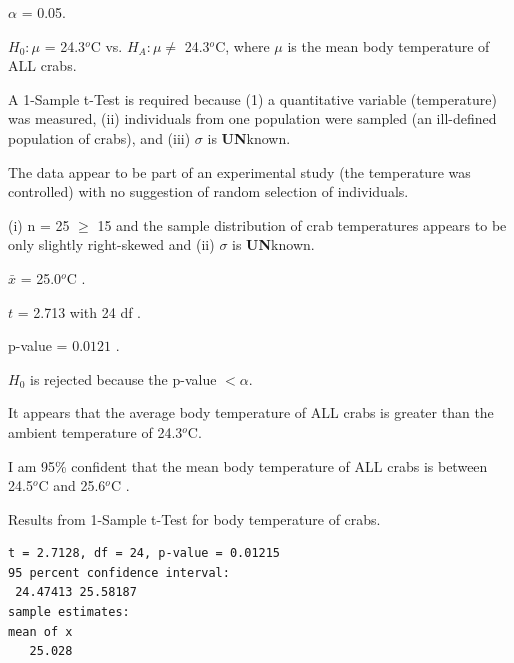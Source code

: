 \documentclass[10pt,openany]{book}\usepackage[]{graphicx}\usepackage[]{color}
\makeatletter
\newenvironment{kframe}{%
 \def\at@end@of@kframe{}%
 \ifinner\ifhmode%
  \def\at@end@of@kframe{\end{minipage}}%
  \begin{minipage}{\columnwidth}%
 \fi\fi%
 \def\FrameCommand##1{\hskip\@totalleftmargin \hskip-\fboxsep
 \colorbox{shadecolor}{##1}\hskip-\fboxsep
     \hskip-\linewidth \hskip-\@totalleftmargin \hskip\columnwidth}%
 \MakeFramed {\advance\hsize-\width
   \@totalleftmargin\z@ \linewidth\hsize
   \@setminipage}}%
 {\par\unskip\endMakeFramed%
 \at@end@of@kframe}
\newenvironment{knitrout}{}{} %
\makeatother
\begin{document}
\begin{Enumerate}
    \item $\alpha$ = 0.05.
    \item $H_{0}:\mu$ = 24.3$^{o}$C vs. $H_{A}:\mu \neq$ 24.3$^{o}$C, where $\mu$ is the mean body temperature of ALL crabs.
    \item A 1-Sample t-Test is required because (1) a quantitative variable (temperature) was measured, (ii) individuals from one population were sampled (an ill-defined population of crabs), and (iii) $\sigma$ is \textbf{UN}known.
    \item The data appear to be part of an experimental study (the temperature was controlled) with no suggestion of random selection of individuals.
    \item (i) n = 25 $\geq$ 15 and the sample distribution of crab temperatures appears to be only slightly right-skewed  and (ii) $\sigma$ is \textbf{UN}known.
    \item $\bar{x}$ = 25.0$^{o}$C .
    \item $t$ = 2.713 with 24 df .
    \item p-value = $0.0121$ .
    \item $H_{0}$ is rejected because the p-value $<\alpha$.
    \item It appears that the average body temperature of ALL crabs is greater than the ambient temperature of 24.3$^{o}$C.
    \item I am 95\% confident that the mean body temperature of ALL crabs is between 24.5$^{o}$C and 25.6$^{o}$C .
\end{Enumerate}

\vspace*{-4pt}
\begin{table}[h]
  \caption{Results from 1-Sample t-Test for body temperature of crabs.}
  \label{tab:1tcrabs}
  \vspace*{-12pt}
\begin{knitrout}
\color{fgcolor}\begin{kframe}
\begin{verbatim}
t = 2.7128, df = 24, p-value = 0.01215
95 percent confidence interval:
 24.47413 25.58187 
sample estimates:
mean of x 
   25.028 
\end{verbatim}
\end{kframe}
\end{knitrout}
\end{table}
\end{document}
